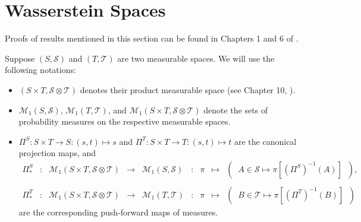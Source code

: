 

\section{Wasserstein Spaces}
\setcounter{theorem}{0}
\setcounter{equation}{0}

Proofs of results mentioned in this section can be found in Chapters 1 and 6 of \cite{Villani2009}.

\vskip 0.5cm
\noindent
Suppose $\left(S,\mathcal{S}\right)$ and $\left(T,\mathcal{T}\right)$ are two measurable spaces.
We will use the following notations:
\begin{itemize}
\item $\left(S \times T, \mathcal{S} \otimes \mathcal{T}\right)$ denotes their product measurable space (see Chapter 10, \cite{JacodProtter}).
\item $\mathcal{M}_{1}\!\left(S,\mathcal{S}\right)$, $\mathcal{M}_{1}\!\left(T,\mathcal{T}\right)$, and
	$\mathcal{M}_{1}\!\left(S \times T, \mathcal{S}\otimes\mathcal{T}\right)$
	denote the sets of probability measures on the respective measurable spaces.
\item
	$\Pi^{S} : S \times T \longrightarrow S : (s,t) \longmapsto s$
	\;and\;
	$\Pi^{T} : S \times T \longrightarrow T : (s,t) \longmapsto t$
	\;are the canonical projection maps, and
	\begin{equation*}
	\begin{array}{ccccccccc}
	\Pi^{S}_{*}
	&:
	&\mathcal{M}_{1}\!\left(S \times T, \mathcal{S}\otimes\mathcal{T}\right)
	&\longrightarrow
	&\mathcal{M}_{1}\!\left(S,\mathcal{S}\right)
	&:
	&\pi
	&\longmapsto
	&\left(\;\;A \in \mathcal{S} \longmapsto \pi\!\left[(\Pi^{S})^{-1}(A)\right]\;\;\right),
	\\ \\
	\Pi^{T}_{*}
	&:
	&\mathcal{M}_{1}\!\left(S \times T, \mathcal{S}\otimes\mathcal{T}\right)
	&\longrightarrow
	&\mathcal{M}_{1}\!\left(T,\mathcal{T}\right)
	&:
	&\pi
	&\longmapsto
	&\left(\;\;B \in \mathcal{T} \longmapsto \pi\!\left[(\Pi^{T})^{-1}(B)\right]\;\;\right)
	\end{array}
	\end{equation*}
	are the corresponding push-forward maps of measures.
\end{itemize}

